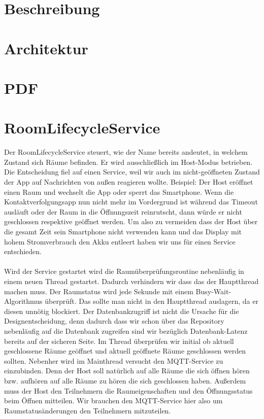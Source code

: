 \section{Beschreibung}
\label{sec:Allgemeine Beschreibung}
\section{Architektur}
\label{sec:Architektur}
\section{PDF}
\label{sec:PDF}
\section{RoomLifecycleService}
\label{sec:RoomLifecycleService}
Der RoomLifecycleService steuert, wie der Name bereits andeutet, in welchem Zustand sich Räume befinden. Er wird ausschließlich im Host-Modus betrieben.
Die Entscheidung fiel auf einen Service, weil wir auch im nicht-geöffneten Zustand der App auf Nachrichten von außen reagieren wollte. 
Beispiel: Der Host eröffnet einen Raum und wechselt die App oder sperrt das Smartphone. Wenn die Kontaktverfolgungsapp nun nicht mehr im Vordergrund ist während das Timeout ausläuft oder der Raum in die Öffnungszeit reinrutscht, dann würde er nicht geschlossen respektive geöffnet werden. Um also zu vermeiden dass der Host über die gesamt Zeit sein Smartphone nicht verwenden kann und das Display mit hohem Stromverbrauch den Akku entleert haben wir uns für einen Service entschieden. 
\\\\
Wird der Service gestartet wird die Raumüberprüfungsroutine nebenläufig in einem neuen Thread gestartet. Dadurch verhindern wir dass das der Hauptthread machen muss. Der Raumstatus wird jede Sekunde mit einem Busy-Wait-Algorithmus überprüft. Das sollte man nicht in den Hauptthread auslagern, da er diesen unnötig blockiert. Der Datenbankzugriff ist nicht die Ursache für die Designentscheidung, denn dadurch dass wir schon über das Repository nebenläufig auf die Datenbank zugreifen sind wir bezüglich Datenbank-Latenz bereits auf der sicheren Seite.
Im Thread überprüfen wir initial ob aktuell geschlossene Räume geöffnet und aktuell geöffnete Räume geschlossen werden sollten.
 Nebenher wird im Mainthread versucht den MQTT-Service zu einzubinden. Denn der Host soll natürlich auf alle Räume die sich öffnen hören bzw. aufhören auf alle Räume zu hören die sich geschlossen haben. 
Außerdem muss der Host den Teilnehmern die Raumeigenschaften und den Öffnungsstatus beim Öffnen mitteilen. Wir brauchen den MQTT-Service hier also um Raumstatusänderungen den Teilnehmern mitzuteilen.
